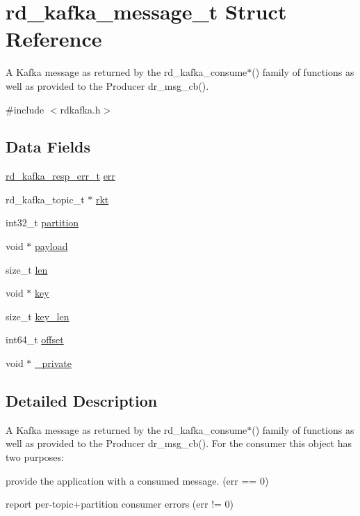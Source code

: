 \hypertarget{structrd__kafka__message__t}{
\section{rd\_\-kafka\_\-message\_\-t Struct Reference}
\label{structrd__kafka__message__t}
}


A Kafka message as returned by the {\ttfamily rd\_\-kafka\_\-consume$\ast$}() family of functions as well as provided to the Producer {\ttfamily dr\_\-msg\_\-cb()}.  


{\ttfamily \#include $<$rdkafka.h$>$}\subsection*{Data Fields}
\begin{DoxyCompactItemize}
\item 
\hyperlink{rdkafka_8h_a03509bab51072c72a8dcf52337e6d5cb}{rd\_\-kafka\_\-resp\_\-err\_\-t} \hyperlink{structrd__kafka__message__t_aed08051a31f216cc0369c734493bbc46}{err}
\item 
rd\_\-kafka\_\-topic\_\-t $\ast$ \hyperlink{structrd__kafka__message__t_ad99c2966a73d2a0be7acf101c41d70f1}{rkt}
\item 
int32\_\-t \hyperlink{structrd__kafka__message__t_aad65babd39a553e48269e7469e36a09a}{partition}
\item 
void $\ast$ \hyperlink{structrd__kafka__message__t_aa78acb7414a91d7009268e84b1526b7f}{payload}
\item 
size\_\-t \hyperlink{structrd__kafka__message__t_a27c4e215c06110e44eec144d449400ae}{len}
\item 
void $\ast$ \hyperlink{structrd__kafka__message__t_a93cbea9d4fb7cfc3e7f546bc5d5f39e2}{key}
\item 
size\_\-t \hyperlink{structrd__kafka__message__t_a170276e797dab0eb732db4eecd329a95}{key\_\-len}
\item 
int64\_\-t \hyperlink{structrd__kafka__message__t_a979bd27da570c93768e474527ddb136e}{offset}
\item 
void $\ast$ \hyperlink{structrd__kafka__message__t_a8eb860a90c978b15892eef54953d5289}{\_\-private}
\end{DoxyCompactItemize}


\subsection{Detailed Description}
A Kafka message as returned by the {\ttfamily rd\_\-kafka\_\-consume$\ast$}() family of functions as well as provided to the Producer {\ttfamily dr\_\-msg\_\-cb()}. For the consumer this object has two purposes:
\begin{DoxyItemize}
\item provide the application with a consumed message. ({\ttfamily err} == 0)
\item report per-\/topic+partition consumer errors ({\ttfamily err} != 0)
\end{DoxyItemize}

